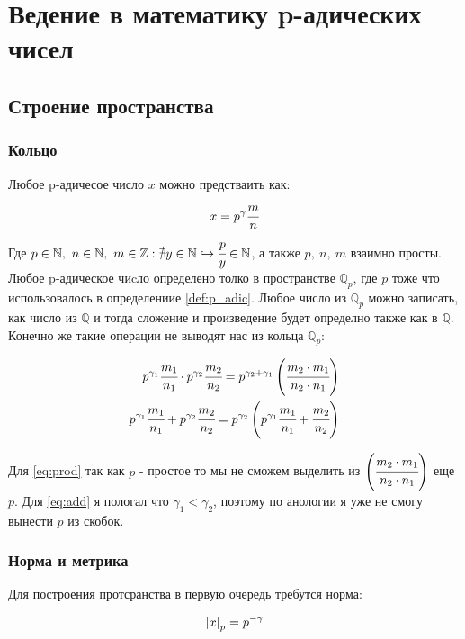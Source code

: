 \chapter{Ведение в математику p-адических чисел}
\section{Строение пространства}

\subsection*{Кольцо}

Любое p-адичесое число $x$ можно предстваить как: 
\begin{equation}
    \label{def:p_adic}
    x = p^\gamma \cfrac{m}{n}
\end{equation}
Где $p \in \mathbb{N}, \ n \in \mathbb{N}, 
\ m \in \mathbb{Z}: \nexists y \in \mathbb{N} 
\hookrightarrow \cfrac{p}{y} \in  \mathbb{N}$, 
а также $p, \ n, \ m$ взаимно просты. 
Любое p-адическое чиcло определено толко в пространстве $\mathbb{Q}_p$,
где $p$ тоже что использовалось в определениие \ref{def:p_adic}. 
Любое число из $\mathbb{Q}_p$ можно записать, как число из $\mathbb{Q}$
и тогда сложение и произведение будет определно также как в $\mathbb{Q}$.
Конечно же такие операции не выводят нас из кольца $\mathbb{Q}_p$:

\begin{eqnarray}
    \label{eq:prod}
    p^{\gamma_1} \cfrac{m_1}{n_1} \cdot p^{\gamma_2} \cfrac{m_2}{n_2} = p^{\gamma_2+\gamma_1} \left( \cfrac{m_2\cdot m_1}{n_2 \cdot n_1} \right)\\
    \label{eq:add}
    p^{\gamma_1} \cfrac{m_1}{n_1} + p^{\gamma_2} \cfrac{m_2}{n_2} = p^{\gamma_2} \left( p^{\gamma_1} \cfrac{m_1}{n_1} + \cfrac{m_2}{n_2} \right)
\end{eqnarray}

Для \ref{eq:prod} так как $p$ - простое то мы не сможем выделить 
из $\left( \cfrac{m_2\cdot m_1}{n_2 \cdot n_1} \right)$ еще $p$.
Для \ref{eq:add} я пологал что $\gamma_1 < \gamma_2$, 
поэтому по анологии я уже не смогу вынести $p$ из скобок.

\subsection*{Норма и метрика}

Для построения протсранства в первую очередь требутся норма: 

\begin{equation}
    \label{def:norm}
    \abs{x}_p = p^{-\gamma}
\end{equation}

